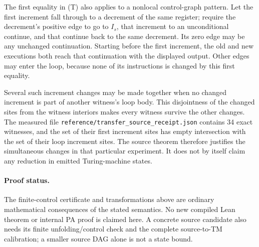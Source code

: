 The first equality in (T) also applies to a nonlocal control-graph pattern.
Let the first increment fall through to a decrement of the same register;
require the decrement's positive edge to go to $I_s$, that increment to an
unconditional continue, and that continue back to the same decrement.  Its
zero edge may be any unchanged continuation.  Starting before the first
increment, the old and new executions both reach that continuation with the
displayed output.  Other edges may enter the loop, because none of its
instructions is changed by this first equality.

Several such increment changes may be made together when no changed
increment is part of another witness's loop body.  This disjointness of the
changed sites from the witness interiors makes every witness survive the
other changes.  The measured file
\texttt{reference/transfer\_source\_receipt.json} contains 34 exact witnesses,
and the set of their first increment sites has empty intersection with the
set of their loop increment sites.  The source theorem therefore justifies
the simultaneous changes in that particular experiment.  It does not by
itself claim any reduction in emitted Turing-machine states.

\paragraph{Proof status.}
The finite-control certificate and transformations above are ordinary
mathematical consequences of the stated semantics.  No new compiled Lean
theorem or internal PA proof is claimed here.  A concrete source candidate
also needs its finite unfolding/control check and the complete source-to-TM
calibration; a smaller source DAG alone is not a state bound.
